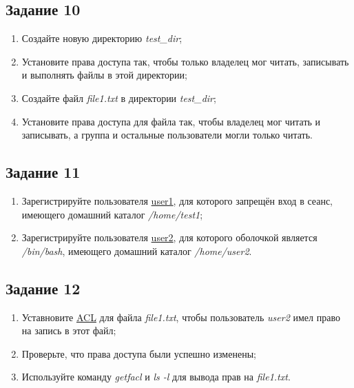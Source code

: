 \documentclass[12pt, a4paper]{report}
\begin{document}
	\subsection*{Задание 10}
	\begin{enumerate}
		\item Создайте новую директорию \textit{test\_dir};
		\item Установите права доступа так, чтобы только владелец мог читать, записывать и выполнять файлы в этой директории;
		\item Создайте файл \textit{file1.txt} в директории \textit{test\_dir};
		\item Установите права доступа для файла так, чтобы владелец мог читать и записывать, а группа и остальные пользователи могли только читать.
	\end{enumerate}
	\lstset{style=mystyle}
	

	\subsection*{Задание 11}
	\begin{enumerate}
		\item Зарегистрируйте пользователя \underline{user1}, для которого запрещён вход в сеанс, имеющего домашний каталог \textit{/home/test1};
		\item Зарегистрируйте пользователя \underline{user2}, для которого оболочкой является \textit{/bin/bash}, имеющего домашний каталог \textit{/home/user2}.
	\end{enumerate}
	\lstset{style=mystyle}
	

	\subsection*{Задание 12}
	\begin{enumerate}
		\item Уставновите \underline{ACL} для файла \textit{file1.txt}, чтобы пользователь \textit{user2} имел право на запись в этот файл;
		\item Проверьте, что права доступа были успешно изменены;
		\item Используйте команду \textit{getfacl} и \textit{ls -l} для вывода прав на \textit{file1.txt}.
	\end{enumerate}
	\lstset{style=mystyle}
	
\end{document}
